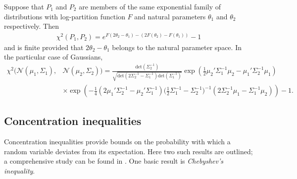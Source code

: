 \begin{lemma}\label{lemma:chi-squared-closed-form}
Suppose that $P_1$ and $P_2$ are members of the same exponential family of distributions with log-partition function $F$ and natural parameters $\theta_1$ and $\theta_2$ respectively. Then
\begin{align*}
\chi^2(P_1, P_2) = e^{F(2\theta_2 - \theta_1) - \left(2F(\theta_2) - F(\theta_1) \right) } - 1
\end{align*}
and is finite provided that $2\theta_2 - \theta_1$ belongs to the natural parameter space.
In the particular case of Gaussians,
\begin{align*}
\chi^2\bigl( \mathcal{N}(\mu_1, \Sigma_1), 
&\mathcal{N}(\mu_2, \Sigma_2)\bigr)
=
\frac{\mathrm{det}(\Sigma_2^{-1})}{\sqrt{\mathrm{det}(2\Sigma_2^{-1} - \Sigma_1^{-1})\mathrm{det}(\Sigma_1^{-1})}}
\exp\left(
\frac12\mu_2'\Sigma_1^{-1}\mu_2 
-\mu_1'\Sigma_2^{-1}\mu_1 
\right)\\
&\times\exp\left(
-\frac14(2\mu_1' \Sigma_2^{-1} - \mu_2' \Sigma_1^{-1})
\bigl(\frac12 \Sigma_1^{-1} - \Sigma_2^{-1}\bigr)^{-1}
(2\Sigma_2^{-1}\mu_1 - \Sigma_1^{-1}\mu_2)
\right) - 1.
\end{align*}
\end{lemma}


\subsection{Concentration inequalities}

Concentration inequalities provide bounds on the probability with which a random variable deviates from its expectation.
Here two such results are outlined; a comprehensive study can be found in \cite{boucheron2013concentration}. 
One basic result is \emph{Chebyshev's inequality}.

